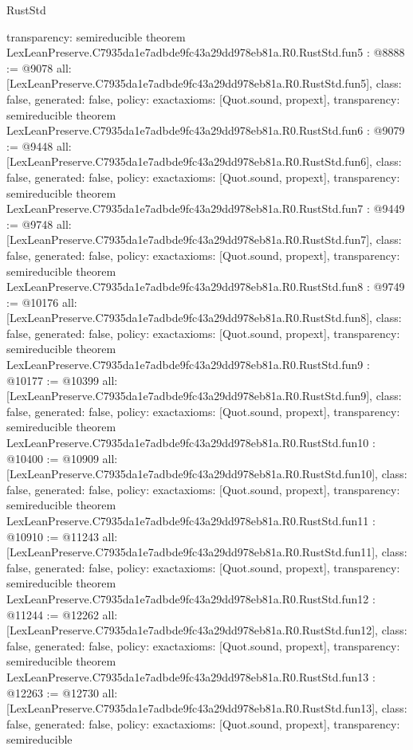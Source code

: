 \begin{lexlean}{RustStd}
\begin{coremodule}
{  transparency: semireducible
}
theorem LexLeanPreserve.C7935da1e7adbde9fc43a29dd978eb81a.R0.RustStd.fun5 : @8888 := @9078 {
  all: [LexLeanPreserve.C7935da1e7adbde9fc43a29dd978eb81a.R0.RustStd.fun5],
  class: false,
  generated: false,
  policy: exact{axioms: [Quot.sound, propext]},
  transparency: semireducible
}
theorem LexLeanPreserve.C7935da1e7adbde9fc43a29dd978eb81a.R0.RustStd.fun6 : @9079 := @9448 {
  all: [LexLeanPreserve.C7935da1e7adbde9fc43a29dd978eb81a.R0.RustStd.fun6],
  class: false,
  generated: false,
  policy: exact{axioms: [Quot.sound, propext]},
  transparency: semireducible
}
theorem LexLeanPreserve.C7935da1e7adbde9fc43a29dd978eb81a.R0.RustStd.fun7 : @9449 := @9748 {
  all: [LexLeanPreserve.C7935da1e7adbde9fc43a29dd978eb81a.R0.RustStd.fun7],
  class: false,
  generated: false,
  policy: exact{axioms: [Quot.sound, propext]},
  transparency: semireducible
}
theorem LexLeanPreserve.C7935da1e7adbde9fc43a29dd978eb81a.R0.RustStd.fun8 : @9749 := @10176 {
  all: [LexLeanPreserve.C7935da1e7adbde9fc43a29dd978eb81a.R0.RustStd.fun8],
  class: false,
  generated: false,
  policy: exact{axioms: [Quot.sound, propext]},
  transparency: semireducible
}
theorem LexLeanPreserve.C7935da1e7adbde9fc43a29dd978eb81a.R0.RustStd.fun9 : @10177 := @10399 {
  all: [LexLeanPreserve.C7935da1e7adbde9fc43a29dd978eb81a.R0.RustStd.fun9],
  class: false,
  generated: false,
  policy: exact{axioms: [Quot.sound, propext]},
  transparency: semireducible
}
theorem LexLeanPreserve.C7935da1e7adbde9fc43a29dd978eb81a.R0.RustStd.fun10 : @10400 := @10909 {
  all: [LexLeanPreserve.C7935da1e7adbde9fc43a29dd978eb81a.R0.RustStd.fun10],
  class: false,
  generated: false,
  policy: exact{axioms: [Quot.sound, propext]},
  transparency: semireducible
}
theorem LexLeanPreserve.C7935da1e7adbde9fc43a29dd978eb81a.R0.RustStd.fun11 : @10910 := @11243 {
  all: [LexLeanPreserve.C7935da1e7adbde9fc43a29dd978eb81a.R0.RustStd.fun11],
  class: false,
  generated: false,
  policy: exact{axioms: [Quot.sound, propext]},
  transparency: semireducible
}
theorem LexLeanPreserve.C7935da1e7adbde9fc43a29dd978eb81a.R0.RustStd.fun12 : @11244 := @12262 {
  all: [LexLeanPreserve.C7935da1e7adbde9fc43a29dd978eb81a.R0.RustStd.fun12],
  class: false,
  generated: false,
  policy: exact{axioms: [Quot.sound, propext]},
  transparency: semireducible
}
theorem LexLeanPreserve.C7935da1e7adbde9fc43a29dd978eb81a.R0.RustStd.fun13 : @12263 := @12730 {
  all: [LexLeanPreserve.C7935da1e7adbde9fc43a29dd978eb81a.R0.RustStd.fun13],
  class: false,
  generated: false,
  policy: exact{axioms: [Quot.sound, propext]},
  transparency: semireducible
}
\end{coremodule}
\end{lexlean}
